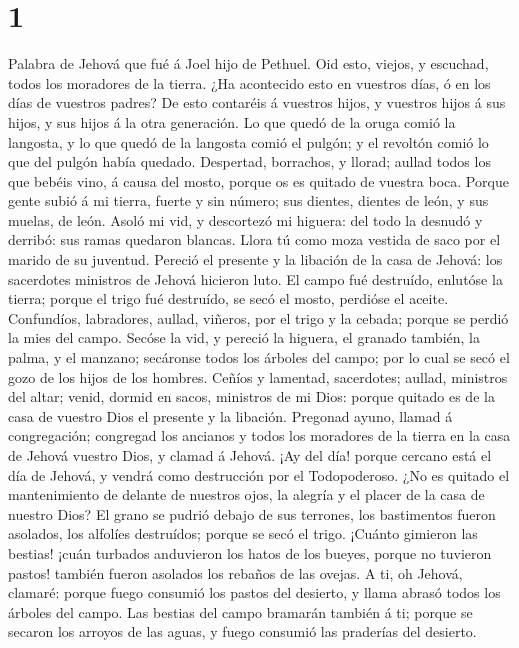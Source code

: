 \hypertarget{section}{%
\section{1}\label{section}}

 Palabra de Jehová que fué á Joel hijo de Pethuel.
 Oid esto, viejos, y escuchad, todos los moradores de la
tierra. ¿Ha acontecido esto en vuestros días, ó en los días de vuestros
padres?  De esto contaréis á vuestros hijos, y vuestros
hijos á sus hijos, y sus hijos á la otra generación.  Lo
que quedó de la oruga comió la langosta, y lo que quedó de la langosta
comió el pulgón; y el revoltón comió lo que del pulgón había quedado.
 Despertad, borrachos, y llorad; aullad todos los que
bebéis vino, á causa del mosto, porque os es quitado de vuestra boca.
 Porque gente subió á mi tierra, fuerte y sin número; sus
dientes, dientes de león, y sus muelas, de león.  Asoló mi
vid, y descortezó mi higuera: del todo la desnudó y derribó: sus ramas
quedaron blancas.  Llora tú como moza vestida de saco por
el marido de su juventud.  Pereció el presente y la
libación de la casa de Jehová: los sacerdotes ministros de Jehová
hicieron luto.  El campo fué destruído, enlutóse la
tierra; porque el trigo fué destruído, se secó el mosto, perdióse el
aceite.  Confundíos, labradores, aullad, viñeros, por el
trigo y la cebada; porque se perdió la mies del campo. 
Secóse la vid, y pereció la higuera, el granado también, la palma, y el
manzano; secáronse todos los árboles del campo; por lo cual se secó el
gozo de los hijos de los hombres.  Ceñíos y lamentad,
sacerdotes; aullad, ministros del altar; venid, dormid en sacos,
ministros de mi Dios: porque quitado es de la casa de vuestro Dios el
presente y la libación.  Pregonad ayuno, llamad á
congregación; congregad los ancianos y todos los moradores de la tierra
en la casa de Jehová vuestro Dios, y clamad á Jehová. 
¡Ay del día! porque cercano está el día de Jehová, y vendrá como
destrucción por el Todopoderoso.  ¿No es quitado el
mantenimiento de delante de nuestros ojos, la alegría y el placer de la
casa de nuestro Dios?  El grano se pudrió debajo de sus
terrones, los bastimentos fueron asolados, los alfolíes destruídos;
porque se secó el trigo.  ¡Cuánto gimieron las bestias!
¡cuán turbados anduvieron los hatos de los bueyes, porque no tuvieron
pastos! también fueron asolados los rebaños de las ovejas.
 A ti, oh Jehová, clamaré: porque fuego consumió los
pastos del desierto, y llama abrasó todos los árboles del campo.
 Las bestias del campo bramarán también á ti; porque se
secaron los arroyos de las aguas, y fuego consumió las praderías del
desierto.

